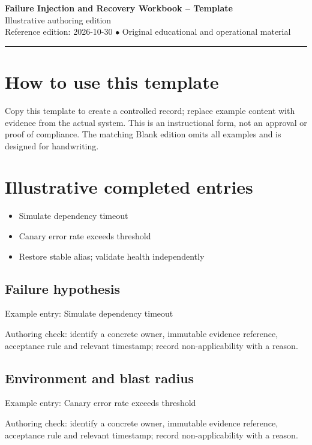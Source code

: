 \documentclass[10pt,letterpaper]{article}
\begin{document}
\begin{center}
{\LARGE\bfseries\color{cdblue}Failure Injection and Recovery Workbook -- Template}\\[7pt]
{\large Illustrative authoring edition}\\[6pt]
{\small Reference edition: 2026-10-30 $\bullet$ Original educational and operational material}
\end{center}
\noindent\color{cdblue}\rule{\linewidth}{1.2pt}\color{black}
\vspace{0.4em}
\section{How to use this template}
Copy this template to create a controlled record; replace example content with evidence from the actual system. This is an instructional form, not an approval or proof of compliance. The matching Blank edition omits all examples and is designed for handwriting.


\section{Illustrative completed entries}
\begin{itemize}
\item Simulate dependency timeout
\item Canary error rate exceeds threshold
\item Restore stable alias; validate health independently
\end{itemize}

\subsection{Failure hypothesis}
Example entry: Simulate dependency timeout

Authoring check: identify a concrete owner, immutable evidence reference, acceptance rule and relevant timestamp; record non-applicability with a reason.


\subsection{Environment and blast radius}
Example entry: Canary error rate exceeds threshold

Authoring check: identify a concrete owner, immutable evidence reference, acceptance rule and relevant timestamp; record non-applicability with a reason.
\end{document}
